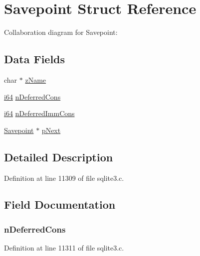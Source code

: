 \hypertarget{struct_savepoint}{}\section{Savepoint Struct Reference}
\label{struct_savepoint}


Collaboration diagram for Savepoint\+:
\subsection*{Data Fields}
\begin{DoxyCompactItemize}
\item 
char $\ast$ \hyperlink{struct_savepoint_a661118d86ac4127d40bf3be78d92117d}{z\+Name}
\item 
\hyperlink{sqlite3_8c_a2a0f0f4ae7001eb54351f77ea1cdbcfd}{i64} \hyperlink{struct_savepoint_a6b3aed744956e6be8b2fce22bfd2b872}{n\+Deferred\+Cons}
\item 
\hyperlink{sqlite3_8c_a2a0f0f4ae7001eb54351f77ea1cdbcfd}{i64} \hyperlink{struct_savepoint_a786ba95eeafb385b1bd53e180a79ed20}{n\+Deferred\+Imm\+Cons}
\item 
\hyperlink{struct_savepoint}{Savepoint} $\ast$ \hyperlink{struct_savepoint_a814ed4793adc9faf64ee3ddef77685a4}{p\+Next}
\end{DoxyCompactItemize}


\subsection{Detailed Description}


Definition at line 11309 of file sqlite3.\+c.



\subsection{Field Documentation}
\hypertarget{struct_savepoint_a6b3aed744956e6be8b2fce22bfd2b872}{}
\subsubsection[{n\+Deferred\+Cons}]{ n\+Deferred\+Cons}\label{struct_savepoint_a6b3aed744956e6be8b2fce22bfd2b872}


Definition at line 11311 of file sqlite3.\+c.



